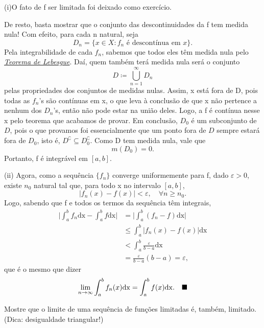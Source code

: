 \documentclass[../analysisII_notes.tex]{subfiles}
\begin{document}
\begin{proof*}
	(i)O fato de f ser limitada foi deixado como exercício.

	De resto, basta mostrar que o conjunto das descontinuidades da f tem medida nula! Com efeito, para cada n natural, seja
	\[
		D_{n} = \{x\in X: f_{n} \text{ é descontínua em }x\}.
	\]
	Pela integrabilidade de cada \(f_{n}\), sabemos que todos eles têm medida nula pelo \hyperlink{lebesgue_theorem}{\textit{Teorema de Lebesgue}}. Daí, quem também terá medida nula será o conjunto
	\[
		D\coloneqq \bigcup_{n=1}^{\infty}D_{n}
	\]
	pelas propriedades dos conjuntos de medidas nulas. Assim, x está fora de D, pois todas as \(f_{n}\)'s são contínuas em x, o que leva à conclusão de que x não pertence a nenhum dos \(D_{n}\)'s, então não pode estar na união deles. Logo, a f é contínua nesse x pelo teorema que acabamos de provar.
	Em conclusão, \(D_{0}\) é um subconjunto de \(D\), pois o que provamos foi essencialmente que um ponto fora de \(D\) sempre estará fora de \(D_{0}\), isto é, \(D^{\complement} \subseteq D_{0}^{\complement}\). Como D tem medida nula, vale que
	\[
		m(D_{0}) = 0.
	\]
	Portanto, f é integrável em \([a, b]\).

	(ii) Agora, como a sequência \(\{f_{n}\}\) converge uniformemente para f, dado \(\varepsilon  > 0\), existe \(n_{0}\) natural tal que, para todo x no intervalo \([a, b]\),
	\[
		|f_{n}(x) - f(x)| < \varepsilon,\quad \forall n \geq n_{0}.
	\]
	Logo, sabendo que f e todos os termos da sequência têm integrais,
	\begin{align*}
		\biggl\vert \int_{a}^{b}f_{n} \mathrm{dx} - \int_{a}^{b}f \mathrm{dx} \biggr\vert & = \biggl\vert \int_{a}^{b}(f_{n} - f) \mathrm{dx} \biggr\vert \\
		                                                                                  & \leq \int_{a}^{b}|f_{n}(x)-f(x)| \mathrm{dx}                  \\
		                                                                                  & < \int_{a}^{b}\frac{\varepsilon }{b-a} \mathrm{dx}            \\
		                                                                                  & = \frac{\varepsilon }{b-a}(b-a) = \varepsilon,
	\end{align*}
	que é o mesmo que dizer
	\[
		\lim_{n\to \infty}\int_{a}^{b}f_{n}(x) \mathrm{dx} = \int_{a}^{b}f(x) \mathrm{dx}. \quad \text{$\blacksquare$}
	\]
\end{proof*}
\begin{exr}
	Mostre que o limite de uma sequência de funções limitadas é, também, limitado. (Dica: desigualdade triangular!)
\end{exr}
\end{document}
